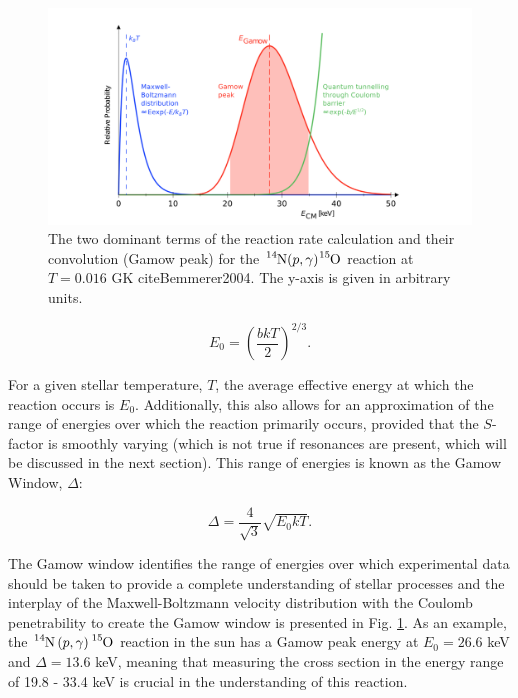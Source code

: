 \begin{figure}
\label{fig: Gamow Peak}
\includegraphics[width=\linewidth]{figures/gamowWindow.png}
\caption{The two dominant terms of the reaction rate calculation and their convolution (Gamow peak) for the $\ce{^{14}N}(p,\gamma)\ce{^{15}O}$ reaction at $T = 0.016$ GK cite{Bemmerer2004}. The y-axis is given in arbitrary units.}
\end{figure}

\begin{equation}
E_{0} = \left( \dfrac{b k T}{2}  \right)^{2/3}. 
\label{eqn: GamowPeak}
\end{equation}

\noindent For a given stellar temperature, $T$, the average effective energy at which the reaction occurs is $E_{0}$. Additionally, this also allows for an approximation of the range of energies over which the reaction primarily occurs, provided that the $S$-factor is smoothly varying (which is not true if resonances are present, which will be discussed in the next section). This range of energies is known as the Gamow Window, $\Delta$:

\begin{equation}
\Delta = \dfrac{4}{\sqrt{3}} \sqrt{E_{0} k T}.
\label{eqn: Gamow window width}
\end{equation}

\noindent The Gamow window identifies the range of energies over which experimental data should be taken to provide a complete understanding of stellar processes and the interplay of the Maxwell-Boltzmann velocity distribution with the Coulomb penetrability to create the Gamow window is presented in Fig. \ref{fig: Gamow Peak}. As an example, the $\ce{^{14}N} \left( p, \gamma \right) \ce{^{15}O}$ reaction in the sun has a Gamow peak energy at $E_{0} = 26.6$ keV and $\Delta = 13.6$ keV, meaning that measuring the cross section in the energy range of 19.8 - 33.4 keV is crucial in the understanding of this reaction. 

